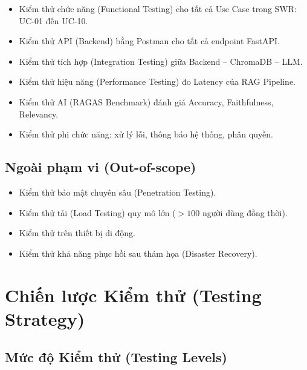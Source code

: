 \begin{itemize}[itemsep=3pt]
  \item Kiểm thử chức năng (Functional Testing) cho tất cả Use Case trong SWR: UC-01 đến UC-10.
  \item Kiểm thử API (Backend) bằng Postman cho tất cả endpoint FastAPI.
  \item Kiểm thử tích hợp (Integration Testing) giữa Backend -- ChromaDB -- LLM.
  \item Kiểm thử hiệu năng (Performance Testing) đo Latency của RAG Pipeline.
  \item Kiểm thử AI (RAGAS Benchmark) đánh giá Accuracy, Faithfulness, Relevancy.
  \item Kiểm thử phi chức năng: xử lý lỗi, thông báo hệ thống, phân quyền.
\end{itemize}

\subsection{Ngoài phạm vi (Out-of-scope)}

\begin{itemize}[itemsep=3pt]
  \item Kiểm thử bảo mật chuyên sâu (Penetration Testing).
  \item Kiểm thử tải (Load Testing) quy mô lớn ($> 100$ người dùng đồng thời).
  \item Kiểm thử trên thiết bị di động.
  \item Kiểm thử khả năng phục hồi sau thảm họa (Disaster Recovery).
\end{itemize}

\section{Chiến lược Kiểm thử (Testing Strategy)}

\subsection{Mức độ Kiểm thử (Testing Levels)}


